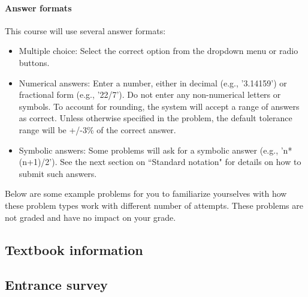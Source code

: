 \documentclass[pdftex, brazil, 12pt, twoside]{article}
\begin{document}
\paragraph{Answer formats} This course will use several answer formats:

\begin{itemize}[noitemsep]
\item Multiple choice: Select the correct option from the dropdown menu or radio buttons.
\item Numerical answers: Enter a number, either in decimal (e.g., '3.14159') or fractional
  form (e.g., '22/7'). Do not enter any non-numerical letters or symbols. To account for
  rounding, the system will accept a range of answers as correct. Unless otherwise specified
  in the problem, the default tolerance range will be +/-3\% of the correct answer.
\item Symbolic answers: Some problems will ask for a symbolic answer (e.g., 'n*(n+1)/2').
  See the next section on “Standard notation" for details on how to submit such answers. 
\end{itemize}

Below are some example problems for you to familiarize yourselves with how these problem
types work with different number of attempts. These problems are not graded and have no
impact on your grade. 


\subsection{Textbook information}
\label{ovw0-book-}


\subsection{Entrance survey}
\label{ovw0-survey-}









\end{document}
